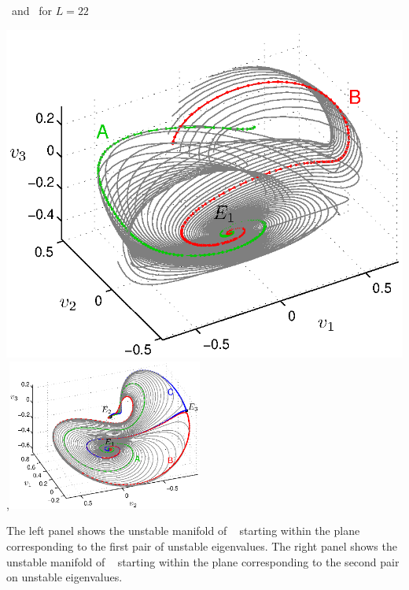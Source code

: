 \documentclass{theo1poster}[2003/04/25]
\begin{document}
\begin{poster}{3}
\begin{sheet}{\Eqva\ and \reqva\ for $L=22$}
\centerline{\includegraphics[width=.48\textwidth]{../../figs/ks22_E1_plane1_manifold_c.eps},\includegraphics[width=0.48\textwidth]{../../figs/ks22_E1_plane2_manifold_c.eps}}
The left panel shows the unstable
manifold of \eqv\  starting within the plane
corresponding to the first pair of unstable eigenvalues. 
The right panel shows the unstable
manifold of \eqv\  starting within the plane
corresponding to the second pair on unstable eigenvalues. 


\end{sheet}
\end{poster}
\end{document}
